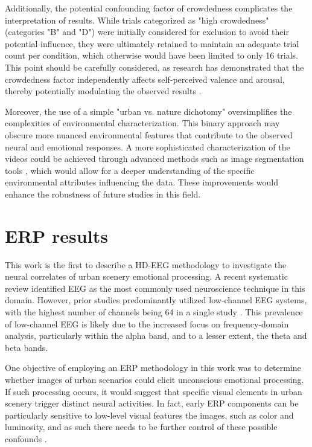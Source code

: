 Additionally, the potential confounding factor of crowdedness complicates the interpretation of results. While trials categorized as "high crowdedness" (categories "B" and "D") were initially considered for exclusion to avoid their potential influence, they were ultimately retained to maintain an adequate trial count per condition, which otherwise would have been limited to only 16 trials. This point should be carefully considered, as research has demonstrated that the crowdedness factor independently affects self-perceived valence and arousal, thereby potentially modulating the observed results \cite{mavrosAttenuatingSubjectiveCrowding2023, mavrosMobileEEGStudy2022}.

Moreover, the use of a simple "urban vs. nature dichotomy" \cite{karmanovAssessingRestorativePotential2008} oversimplifies the complexities of environmental characterization. This binary approach may obscure more nuanced environmental features that contribute to the observed neural and emotional responses. A more sophisticated characterization of the videos could be achieved through advanced methods such as image segmentation tools \cite{shenBackVillageAssessing2024a}, which would allow for a deeper understanding of the specific environmental attributes influencing the data. These improvements would enhance the robustness of future studies in this field.

\section{ERP results}

This work is the first to describe a HD-EEG methodology to investigate the neural correlates of urban scenery emotional processing. A recent systematic review identified EEG as the most commonly used neuroscience technique in this domain. However, prior studies predominantly utilized low-channel EEG systems, with the highest number of channels being 64 in a single study \cite{ancoraCitiesNeuroscienceResearch2022}. This prevalence of low-channel EEG is likely due to the increased focus on frequency-domain analysis, particularly within the alpha band, and to a lesser extent, the theta and beta bands.

One objective of employing an ERP methodology in this work was to determine whether images of urban scenarios could elicit unconscious emotional processing. If such processing occurs, it would suggest that specific visual elements in urban scenery trigger distinct neural activities. In fact, early ERP components can be particularly sensitive to low-level visual features the images, such as color and luminosity, and as such there needs to be further control of these possible confounds \cite{grassiniProcessingNaturalScenery2019}.

